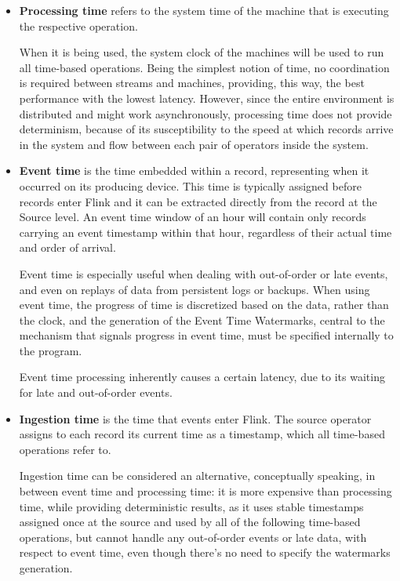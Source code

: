 \begin{itemize}
    \item \textbf{Processing time} refers to the system time of the machine that is executing the respective operation.
    
    When it is being used, the system clock of the machines will be used to run all time-based operations. Being the simplest notion of time, no coordination is required between streams and machines, providing, this way, the best performance with the lowest latency. However, since the entire environment is distributed and might work asynchronously, processing time does not provide determinism, because of its susceptibility to the speed at which records arrive in the system and flow between each pair of operators inside the system.
    
    \item \textbf{Event time} is the time embedded within a record, representing when it occurred on its producing device. This time is typically assigned before records enter Flink and it can be extracted directly from the record at the Source level. An event time window of an hour will contain only records carrying an event timestamp within that hour, regardless of their actual time and order of arrival.
    
    Event time is especially useful when dealing with out-of-order or late events, and even on replays of data from persistent logs or backups. When using event time, the progress of time is discretized based on the data, rather than the clock, and the generation of the Event Time Watermarks, central to the mechanism that signals progress in event time,  must be specified internally to the program.
    
    Event time processing inherently causes a certain latency, due to its waiting for late and out-of-order events.
    
    \item \textbf{Ingestion time} is the time that events enter Flink. The source operator assigns to each record its current time as a timestamp, which all time-based operations refer to.
    
    Ingestion time can be considered an alternative, conceptually speaking, in between event time and processing time: it is more expensive than processing time, while providing deterministic results, as it uses stable timestamps assigned once at the source and used by all of the following time-based operations, but cannot handle any out-of-order events or late data, with respect to event time, even though there's no need to specify the watermarks generation.
\end{itemize}


